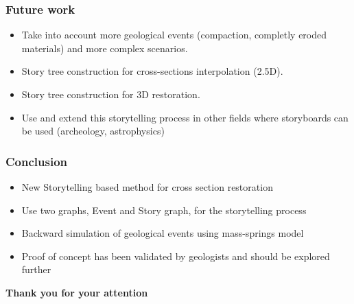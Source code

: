 \documentclass{beamer}
\begin{document}
	\begin{frame}
	\frametitle{Future work}
	\begin{itemize}
	\item Take into account more geological events (compaction, completly eroded materials) and more complex scenarios.
	\item Story tree construction for cross-sections interpolation (2.5D). 
	\item Story tree construction for 3D restoration.
	\item Use and extend this storytelling process in other fields where storyboards can be used (archeology, astrophysics)
	\end{itemize}
	\end{frame}
	
	\begin{frame}
	\frametitle{Conclusion}
	\begin{itemize}
	\item New Storytelling based method for cross section restoration
	\item Use two graphs, Event and Story graph, for the storytelling process
	\item Backward simulation of geological events  using mass-springs model
	\item Proof of concept has been validated by geologists and should be explored further
	\end{itemize}
	\end{frame}

	\begin{frame}
	\begin{center}
	\textbf{Thank you for your attention}
	\end{center}
	\end{frame}
\end{document}
